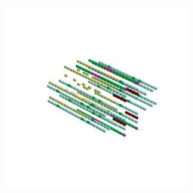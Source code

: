 \begin{minipage}[b]{0.50\linewidth}
\begin{figure}[H]
        \vspace*{-8cm}
        \hspace*{2cm}
        \includegraphics[width=8cm]{src/symmetries/pattern12_4-45.png}
        \vspace*{-2.5cm}
  \caption*{}
  \end{figure}
\end{minipage}
\hspace{1cm}
